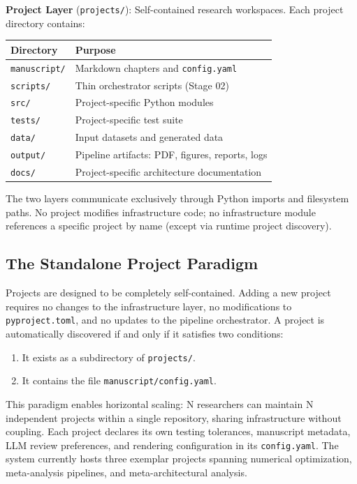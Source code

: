 \documentclass[
]{article}
\newcounter{none} %
\providecommand{\tightlist}{%
  \setlength{\itemsep}{0pt}\setlength{\parskip}{0pt}}
\begin{document}
\textbf{Project Layer} (\texttt{projects/}): Self-contained research
workspaces. Each project directory contains:

{\def\LTcaptype{none} %
\begin{longtable}[]{@{}ll@{}}
\toprule\noalign{}
Directory & Purpose \\
\midrule\noalign{}
\endhead
\bottomrule\noalign{}
\endlastfoot
\texttt{manuscript/} & Markdown chapters and \texttt{config.yaml} \\
\texttt{scripts/} & Thin orchestrator scripts (Stage 02) \\
\texttt{src/} & Project-specific Python modules \\
\texttt{tests/} & Project-specific test suite \\
\texttt{data/} & Input datasets and generated data \\
\texttt{output/} & Pipeline artifacts: PDF, figures, reports, logs \\
\texttt{docs/} & Project-specific architecture documentation \\
\end{longtable}
}

The two layers communicate exclusively through Python imports and
filesystem paths. No project modifies infrastructure code; no
infrastructure module references a specific project by name (except via
runtime project discovery).

\subsection{The Standalone Project
Paradigm}\label{the-standalone-project-paradigm}

Projects are designed to be completely self-contained. Adding a new
project requires no changes to the infrastructure layer, no
modifications to \texttt{pyproject.toml}, and no updates to the pipeline
orchestrator. A project is automatically discovered if and only if it
satisfies two conditions:

\begin{enumerate}
\def\labelenumi{\arabic{enumi}.}
\tightlist
\item
  It exists as a subdirectory of \texttt{projects/}.
\item
  It contains the file \texttt{manuscript/config.yaml}.
\end{enumerate}

This paradigm enables horizontal scaling: N researchers can maintain N
independent projects within a single repository, sharing infrastructure
without coupling. Each project declares its own testing tolerances,
manuscript metadata, LLM review preferences, and rendering configuration
in its \texttt{config.yaml}. The system currently hosts three exemplar
projects spanning numerical optimization, meta-analysis pipelines, and
meta-architectural analysis.
\end{document}
